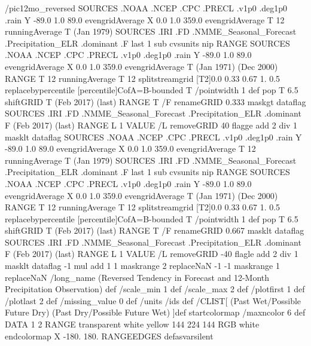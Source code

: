 \begin{ingrid}
/pic12mo_reversed {
  SOURCES .NOAA .NCEP .CPC .PRECL .v1p0 .deg1p0 .rain
  Y -89.0 1.0 89.0 evengridAverage
  X 0.0 1.0 359.0 evengridAverage
  T 12 runningAverage
  T (Jan 1979) SOURCES .IRI .FD .NMME_Seasonal_Forecast .Precipitation_ELR .dominant .F last 1 sub cvsunits nip RANGE
SOURCES .NOAA .NCEP .CPC .PRECL .v1p0 .deg1p0 .rain
   Y -89.0 1.0 89.0 evengridAverage
   X 0.0 1.0 359.0 evengridAverage
   T (Jan 1971) (Dec 2000) RANGE
   T 12 runningAverage
   T 12 splitstreamgrid
   [T2]0.0 0.33 0.67 1. 0.5 replacebypercentile
   [percentile]CofA=B-bounded
  T
   /pointwidth 1 def
   pop
  T 6.5 shiftGRID
  T (Feb 2017) (last) RANGE 
  T /F renameGRID
  0.333 maskgt
  dataflag
  SOURCES .IRI .FD .NMME_Seasonal_Forecast .Precipitation_ELR .dominant
   F (Feb 2017) (last) RANGE
   L 1 VALUE
   /L removeGRID
   40 flagge
   add
  2 div
  1 masklt
  dataflag
  SOURCES .NOAA .NCEP .CPC .PRECL .v1p0 .deg1p0 .rain
   Y -89.0 1.0 89.0 evengridAverage
   X 0.0 1.0 359.0 evengridAverage
   T 12 runningAverage
   T (Jan 1979) SOURCES .IRI .FD .NMME_Seasonal_Forecast .Precipitation_ELR .dominant .F last 1 sub cvsunits nip RANGE
   SOURCES .NOAA .NCEP .CPC .PRECL .v1p0 .deg1p0 .rain
    Y -89.0 1.0 89.0 evengridAverage
    X 0.0 1.0 359.0 evengridAverage
    T (Jan 1971) (Dec 2000) RANGE
    T 12 runningAverage
    T 12 splitstreamgrid
    [T2]0.0 0.33 0.67 1. 0.5 replacebypercentile
    [percentile]CofA=B-bounded
   T
    /pointwidth 1 def
    pop
   T 6.5 shiftGRID
   T (Feb 2017) (last) RANGE
   T /F renameGRID
   0.667 masklt
   dataflag
   SOURCES .IRI .FD .NMME_Seasonal_Forecast .Precipitation_ELR .dominant
    F (Feb 2017) (last) RANGE
    L 1 VALUE
    /L removeGRID
    -40 flagle
    add
   2 div
   1 masklt
   dataflag
   -1 mul
   add
  1 1 maskrange
  2 replaceNaN
  -1 -1 maskrange
  1 replaceNaN
  /long_name (Reversed Tendency in Forecast and 12-Month Precipitation Observation) def
  /scale_min 1 def
  /scale_max 2 def
  /plotfirst 1 def
  /plotlast 2 def
  /missing_value 0 def
  /units /ids def
  /CLIST[ (Past Wet/Possible Future Dry) (Past Dry/Possible Future Wet) ]def
  startcolormap
    /maxncolor 6 def
    DATA
    1 2 RANGE
    transparent white yellow 144
         224 144 RGB
         white endcolormap
X -180. 180. RANGEEDGES
} defasvarsilent
\end{ingrid}
